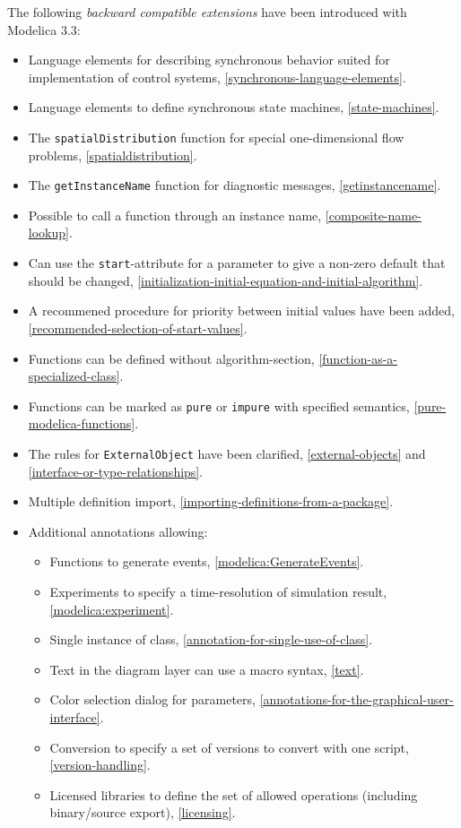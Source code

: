The following \emph{backward compatible extensions} have been introduced with Modelica 3.3:
\begin{itemize}
\item
  Language elements for describing synchronous behavior suited for
  implementation of control systems, \cref{synchronous-language-elements}.
\item
  Language elements to define synchronous state machines, \cref{state-machines}.
\item
  The \lstinline!spatialDistribution! function for special one-dimensional flow problems, \cref{spatialdistribution}.
\item
  The \lstinline!getInstanceName! function for diagnostic messages, \cref{getinstancename}.
\item
  Possible to call a function through an instance name, \cref{composite-name-lookup}.
\item
  Can use the \lstinline!start!-attribute for a parameter to give a non-zero default that should be changed, \cref{initialization-initial-equation-and-initial-algorithm}.
\item
  A recommened procedure for priority between initial values have been added, \cref{recommended-selection-of-start-values}.
\item
  Functions can be defined without algorithm-section, \cref{function-as-a-specialized-class}.
\item
  Functions can be marked as \lstinline!pure! or \lstinline!impure! with specified semantics, \cref{pure-modelica-functions}.
\item
  The rules for \lstinline!ExternalObject! have been clarified, \cref{external-objects} and \cref{interface-or-type-relationships}.
\item
  Multiple definition import, \cref{importing-definitions-from-a-package}.
\item
  Additional annotations allowing:
  \begin{itemize}
  \item
    Functions to generate events, \cref{modelica:GenerateEvents}.
  \item
    Experiments to specify a time-resolution of simulation result, \cref{modelica:experiment}.
  \item
    Single instance of class, \cref{annotation-for-single-use-of-class}.
  \item
    Text in the diagram layer can use a macro syntax, \cref{text}.
  \item
    Color selection dialog for parameters, \cref{annotations-for-the-graphical-user-interface}.
  \item
    Conversion to specify a set of versions to convert with one script,
    \cref{version-handling}.
  \item
    Licensed libraries to define the set of allowed operations
    (including binary/source export), \cref{licensing}.
  \end{itemize}
\end{itemize}

